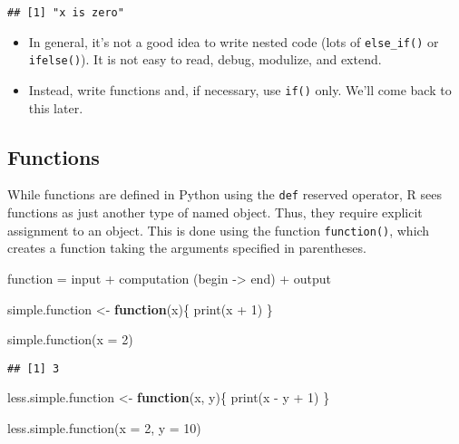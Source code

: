 \documentclass[
]{book}
\newenvironment{Shaded}{\begin{snugshade}}{\end{snugshade}}
\newcommand{\AttributeTok}[1]{\textcolor[rgb]{0.77,0.63,0.00}{#1}}
\newcommand{\ControlFlowTok}[1]{\textcolor[rgb]{0.13,0.29,0.53}{\textbf{#1}}}
\newcommand{\DecValTok}[1]{\textcolor[rgb]{0.00,0.00,0.81}{#1}}
\newcommand{\FunctionTok}[1]{\textcolor[rgb]{0.00,0.00,0.00}{#1}}
\newcommand{\NormalTok}[1]{#1}
\newcommand{\OtherTok}[1]{\textcolor[rgb]{0.56,0.35,0.01}{#1}}
\newcommand{\SpecialCharTok}[1]{\textcolor[rgb]{0.00,0.00,0.00}{#1}}
\providecommand{\tightlist}{%
  \setlength{\itemsep}{0pt}\setlength{\parskip}{0pt}}
\begin{document}
\begin{verbatim}
## [1] "x is zero"
\end{verbatim}

\begin{itemize}
\tightlist
\item
  In general, it's not a good idea to write nested code (lots of \texttt{else\_if()} or \texttt{ifelse()}). It is not easy to read, debug, modulize, and extend.
\item
  Instead, write functions and, if necessary, use \texttt{if()} only. We'll come back to this later.
\end{itemize}

\hypertarget{functions}{%
\subsection{Functions}\label{functions}}

While functions are defined in Python using the \texttt{def} reserved operator, R sees functions as just another type of named object. Thus, they require explicit assignment to an object. This is done using the function \texttt{function()}, which creates a function taking the arguments specified in parentheses.

function = input + computation (begin -\textgreater{} end) + output

\begin{Shaded}
\begin{Highlighting}[]
\NormalTok{simple.function }\OtherTok{\textless{}{-}} \ControlFlowTok{function}\NormalTok{(x)\{}
  \FunctionTok{print}\NormalTok{(x }\SpecialCharTok{+} \DecValTok{1}\NormalTok{)}
\NormalTok{\}}

\FunctionTok{simple.function}\NormalTok{(}\AttributeTok{x =} \DecValTok{2}\NormalTok{)}
\end{Highlighting}
\end{Shaded}

\begin{verbatim}
## [1] 3
\end{verbatim}

\begin{Shaded}
\begin{Highlighting}[]
\NormalTok{less.simple.function }\OtherTok{\textless{}{-}} \ControlFlowTok{function}\NormalTok{(x, y)\{}
  \FunctionTok{print}\NormalTok{(x }\SpecialCharTok{{-}}\NormalTok{ y }\SpecialCharTok{+} \DecValTok{1}\NormalTok{)}
\NormalTok{\}}

\FunctionTok{less.simple.function}\NormalTok{(}\AttributeTok{x =} \DecValTok{2}\NormalTok{, }\AttributeTok{y =} \DecValTok{10}\NormalTok{)}
\end{Highlighting}
\end{Shaded}
\end{document}
